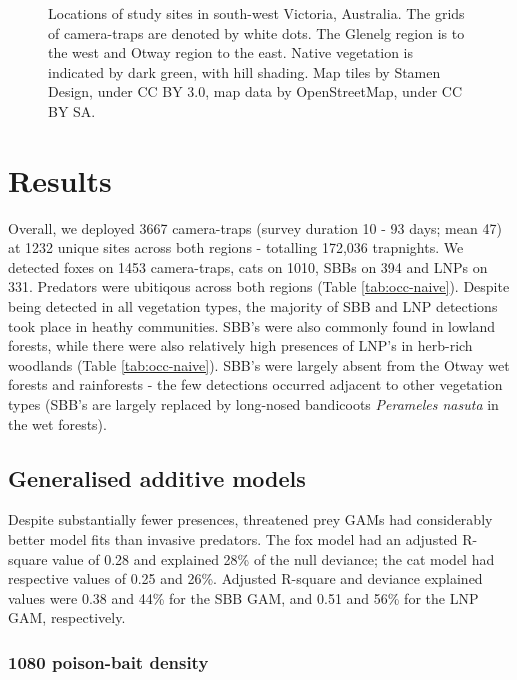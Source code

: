 \documentclass[11pt,a4paper,titlepage,twoside,openright]{style/unimelbthesis}
\begin{document}
\begin{mainmatter}
\begin{figure}
{}

\caption{Locations of study sites in south-west Victoria, Australia. The grids of camera-traps are denoted by white dots. The Glenelg region is to the west and Otway region to the east. Native vegetation is indicated by dark green, with hill shading. Map tiles by Stamen Design, under CC BY 3.0, map data by OpenStreetMap, under CC BY SA.}\label{fig:occ-map}
\end{figure}
\newpage

\hypertarget{results-1}{%
\section{Results}\label{results-1}}

Overall, we deployed 3667 camera-traps (survey duration 10 - 93 days; mean 47) at 1232 unique sites across both regions - totalling 172,036 trapnights. We detected foxes on 1453 camera-traps, cats on 1010, SBBs on 394 and LNPs on 331. Predators were ubitiqous across both regions (Table \ref{tab:occ-naive}). Despite being detected in all vegetation types, the majority of SBB and LNP detections took place in heathy communities. SBB's were also commonly found in lowland forests, while there were also relatively high presences of LNP's in herb-rich woodlands (Table \ref{tab:occ-naive}). SBB's were largely absent from the Otway wet forests and rainforests - the few detections occurred adjacent to other vegetation types (SBB's are largely replaced by long-nosed bandicoots \emph{Perameles nasuta} in the wet forests).

\hypertarget{generalised-additive-models-1}{%
\subsection{Generalised additive models}\label{generalised-additive-models-1}}

Despite substantially fewer presences, threatened prey GAMs had considerably better model fits than invasive predators. The fox model had an adjusted R-square value of 0.28 and explained 28\% of the null deviance; the cat model had respective values of 0.25 and 26\%. Adjusted R-square and deviance explained values were 0.38 and 44\% for the SBB GAM, and 0.51 and 56\% for the LNP GAM, respectively.

\hypertarget{poison-bait-density-1}{%
\subsubsection{1080 poison-bait density}\label{poison-bait-density-1}}


\end{mainmatter}
\end{document}
